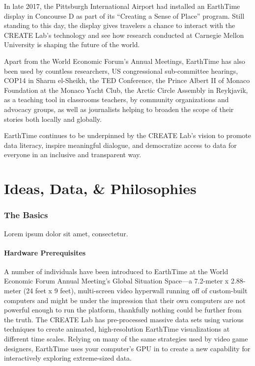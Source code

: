 \documentclass[
  12pt,
]{krantz}
\begin{document}
In late 2017, the Pittsburgh International Airport had installed an EarthTime display in Concourse D as part of its ``Creating a Sense of Place'' program. Still standing to this day, the display gives travelers a chance to interact with the CREATE Lab's technology and see how research conducted at Carnegie Mellon University is shaping the future of the world.

Apart from the World Economic Forum's Annual Meetings, EarthTime has also been used by countless researchers, US congressional sub-committee hearings, COP14 in Sharm el-Sheikh, the TED Conference, the Prince Albert II of Monaco Foundation at the Monaco Yacht Club, the Arctic Circle Assembly in Reykjavik, as a teaching tool in classrooms teachers, by community organizations and advocacy groups, as well as journalists helping to broaden the scope of their stories both locally and globally.

EarthTime continues to be underpinned by the CREATE Lab's vision to promote data literacy, inspire meaningful dialogue, and democratize access to data for everyone in an inclusive and transparent way.

\hypertarget{part-ideas-data-philosophies}{%
\part{Ideas, Data, \& Philosophies}\label{part-ideas-data-philosophies}}

\hypertarget{the-basics}{%
\section{The Basics}\label{the-basics}}

Lorem ipsum dolor sit amet, consectetur.

\hypertarget{hardware-prerequisites}{%
\subsection{Hardware Prerequisites}\label{hardware-prerequisites}}

A number of individuals have been introduced to EarthTime at the World Economic Forum Annual Meeting's Global Situation Space---a 7.2-meter x 2.88-meter (24 feet x 9 feet), multi-screen video hyperwall running off of custom-built computers and might be under the impression that their own computers are not powerful enough to run the platform, thankfully nothing could be further from the truth. The CREATE Lab has pre-processed massive data sets using various techniques to create animated, high-resolution EarthTime visualizations at different time scales. Relying on many of the same strategies used by video game designers, EarthTime uses your computer's GPU in to create a new capability for interactively exploring extreme-sized data.
\end{document}
